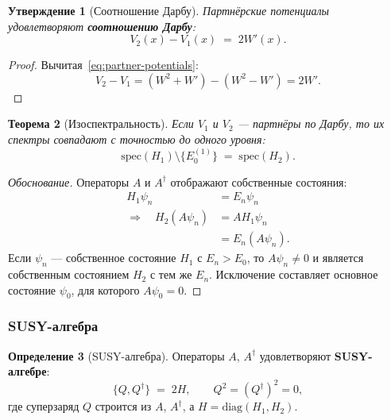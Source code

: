 \documentclass[11pt,a4paper]{article}
\newtheorem{theorem}{Теорема}[section]
\newtheorem{proposition}[theorem]{Утверждение}
\theoremstyle{definition}
\newtheorem{definition}[theorem]{Определение}
\begin{document}
\begin{proposition}[Соотношение Дарбу]
\label{prop:darboux}
Партнёрские потенциалы удовлетворяют \textbf{соотношению Дарбу}:
\begin{equation}
    \boxed{
    V_2(x) - V_1(x) \;=\; 2 W'(x).
    }
    \label{eq:darboux-relation}
\end{equation}
\end{proposition}

\begin{proof}
Вычитая~\eqref{eq:partner-potentials}:
\begin{equation}
    V_2 - V_1 = (W^2 + W') - (W^2 - W') = 2 W'.
\end{equation}
\end{proof}

\begin{theorem}[Изоспектральность]
\label{thm:isospectrality}
Если $V_1$ и $V_2$ --- партнёры по Дарбу, то их спектры
совпадают с точностью до одного уровня:
\begin{equation}
    \mathrm{spec}(H_1) \setminus \{E_0^{(1)}\}
    \;=\; \mathrm{spec}(H_2).
    \label{eq:isospectrality}
\end{equation}
\end{theorem}

\begin{proof}[Обоснование]
Операторы $A$ и $A^\dagger$ отображают собственные состояния:
\begin{align}
    H_1 \psi_n &= E_n \psi_n \nonumber \\
    \Longrightarrow\quad
    H_2 (A \psi_n) &= A H_1 \psi_n \nonumber \\
    &= E_n (A \psi_n).
\end{align}
Если $\psi_n$ --- собственное состояние $H_1$ с $E_n > E_0$,
то $A \psi_n \neq 0$ и является собственным состоянием $H_2$
с тем же $E_n$. Исключение составляет основное состояние
$\psi_0$, для которого $A \psi_0 = 0$.
\end{proof}

\subsubsection{SUSY-алгебра}

\begin{definition}[SUSY-алгебра]
\label{def:susy-algebra}
Операторы $A$, $A^\dagger$ удовлетворяют \textbf{SUSY-алгебре}:
\begin{equation}
    \{Q, Q^\dagger\} \;=\; 2H, \qquad Q^2 = (Q^\dagger)^2 = 0,
    \label{eq:susy-algebra}
\end{equation}
где суперзаряд $Q$ строится из $A$, $A^\dagger$,
а $H = \mathrm{diag}(H_1, H_2)$.
\end{definition}
\end{document}
